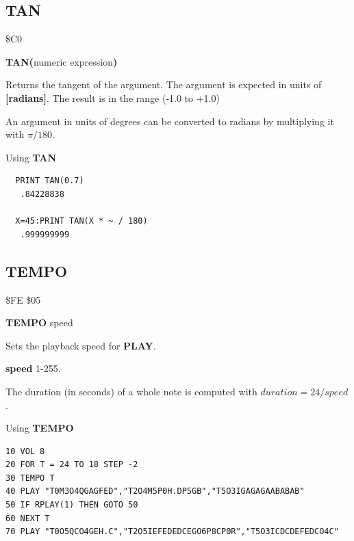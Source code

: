 
\newpage
\subsection{TAN}
\begin{description}[leftmargin=2cm,style=nextline]
\item [Token:] \$C0
\item [Format:] {\bf TAN(}numeric expression{\bf)}
\item [Usage:] Returns the tangent of the
               argument.
               The argument is expected in units of {\bf [radians]}.
               The result is in the range (-1.0 to +1.0)

\item [Remarks:] An argument in units of degrees
                 can be converted to radians
                 by multiplying it with $\pi/180$.
\item [Example:] Using {\bf TAN}
\begin{tcolorbox}[colback=black,coltext=white]
\verbatimfont{\codefont}
\begin{verbatim}
  PRINT TAN(0.7)
   .84228838

  X=45:PRINT TAN(X * ~ / 180)
   .999999999
\end{verbatim}
\end{tcolorbox}
\end{description}


\newpage
\subsection{TEMPO}
\begin{description}[leftmargin=2cm,style=nextline]
\item [Token:] \$FE \$05
\item [Format:] {\bf TEMPO} speed
\item [Usage:] Sets the playback speed for {\bf PLAY}.

               {\bf speed} 1-255.

               The duration (in seconds) of a whole note is computed with
               $ duration = 24 / speed $.

\item [Example:] Using {\bf TEMPO}
\begin{tcolorbox}[colback=black,coltext=white]
\verbatimfont{\codefont}
\begin{verbatim}
10 VOL 8
20 FOR T = 24 TO 18 STEP -2
30 TEMPO T
40 PLAY "T0M3O4QGAGFED","T2O4M5P0H.DP5GB","T5O3IGAGAGAABABAB"
50 IF RPLAY(1) THEN GOTO 50
60 NEXT T
70 PLAY "T0O5QCO4GEH.C","T2O5IEFEDEDCEGO6P8CP0R","T5O3ICDCDEFEDCO4C"
\end{verbatim}
\end{tcolorbox}
\end{description}

